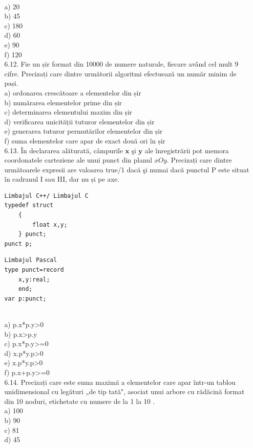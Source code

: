 \\
a) 20
\\
b) 45
\\
c) 180
\\
d) 60
\\
e) 90
\\
f) 120
\\
6.12. Fie un șir format din 10000 de numere naturale, fiecare având cel mult 9 cifre. Precizați care dintre următorii algoritmi efectuează un număr minim de pași.
\\
a) ordonarea crescătoare a elementelor din șir
\\
b) numărarea elementelor prime din șir
\\
c) determinarea elementului maxim din șir
\\
d) verificarea unicității tuturor elementelor din șir
\\
e) generarea tuturor permutărilor elementelor din șir
\\
f) suma elementelor care apar de exact două ori în șir
\\
6.13. În declararea alăturată, câmpurile $\mathbf{x}$ şi $\mathbf{y}$ ale înregistrării pot memora coordonatele carteziene ale unui punct din planul $x O y$. Precizați care dintre următoarele expresii are valoarea true/1 dacă şi numai dacă punctul P este situat în cadranul I sau III, dar nu și pe axe.
\begin{verbatim}
Limbajul C++/ Limbajul C
typedef struct
    {
        float x,y;
    } punct;
punct p;
\end{verbatim}
\begin{verbatim}
Limbajul Pascal
type punct=record
    x,y:real;
    end;
var p:punct;
\end{verbatim}
\\
a) p.x*p.y>0
\\
b) p.x>p.y
\\
c) p.x*p.y>=0
\\
d) x.p*y.p>0
\\
e) x.p*y.p>0
\\
f) p.x+p.y>=0
\\
6.14. Precizați care este suma maximă a elementelor care apar într-un tablou unidimensional cu legături „de tip tată", asociat unui arbore cu rădăcină format din 10 noduri, etichetate cu numere de la 1 la 10 .
\\
a) 100
\\
b) 90
\\
c) 81
\\
d) 45
\\

